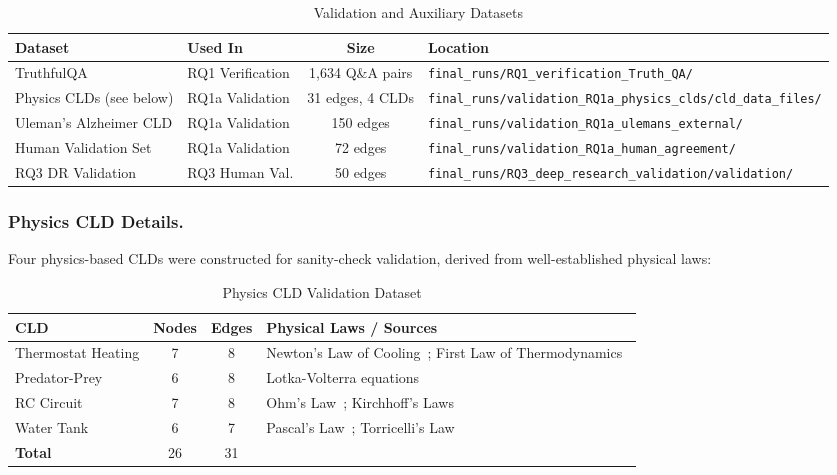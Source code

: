 \begin{table}[H]
\centering
\caption{Validation and Auxiliary Datasets}
\label{tab:validation_datasets}
\footnotesize
\begin{tabularx}{\textwidth}{@{}l l c X@{}}
\toprule
\textbf{Dataset} & \textbf{Used In} & \textbf{Size} & \textbf{Location} \\
\midrule
TruthfulQA~\cite{lin2022truthfulqameasuringmodelsmimic} & RQ1 Verification & 1,634 Q\&A pairs & \texttt{final\_runs/RQ1\_verification\_Truth\_QA/} \\
Physics CLDs (see below) & RQ1a Validation & 31 edges, 4 CLDs & \texttt{final\_runs/validation\_RQ1a\_physics\_clds/cld\_data\_files/} \\
Uleman's Alzheimer CLD & RQ1a Validation & 150 edges & \texttt{final\_runs/validation\_RQ1a\_ulemans\_external/} \\
Human Validation Set & RQ1a Validation & 72 edges & \texttt{final\_runs/validation\_RQ1a\_human\_agreement/} \\
RQ3 DR Validation & RQ3 Human Val. & 50 edges & \texttt{final\_runs/RQ3\_deep\_research\_validation/validation/} \\
\bottomrule
\end{tabularx}
\end{table}

\subsubsection{Physics CLD Details.} Four physics-based CLDs were constructed for sanity-check validation, derived from well-established physical laws:

\begin{table}[H]
\centering
\caption{Physics CLD Validation Dataset}
\label{tab:physics_cld_dataset}
\footnotesize
\begin{tabularx}{\textwidth}{@{}l c c X@{}}
\toprule
\textbf{CLD} & \textbf{Nodes} & \textbf{Edges} & \textbf{Physical Laws / Sources} \\
\midrule
Thermostat Heating & 7 & 8 & Newton's Law of Cooling~\cite{newton1701scala}; First Law of Thermodynamics~\cite{clausius1850heat} \\
Predator-Prey & 6 & 8 & Lotka-Volterra equations~\cite{lotka1925elements,volterra1928fluctuations} \\
RC Circuit & 7 & 8 & Ohm's Law~\cite{ohm1827galvanische}; Kirchhoff's Laws~\cite{kirchhoff1845durchgang} \\
Water Tank & 6 & 7 & Pascal's Law~\cite{pascal1663equilibre}; Torricelli's Law~\cite{torricelli1644opera} \\
\midrule
\textbf{Total} & 26 & 31 & \\
\bottomrule
\end{tabularx}
\end{table}

